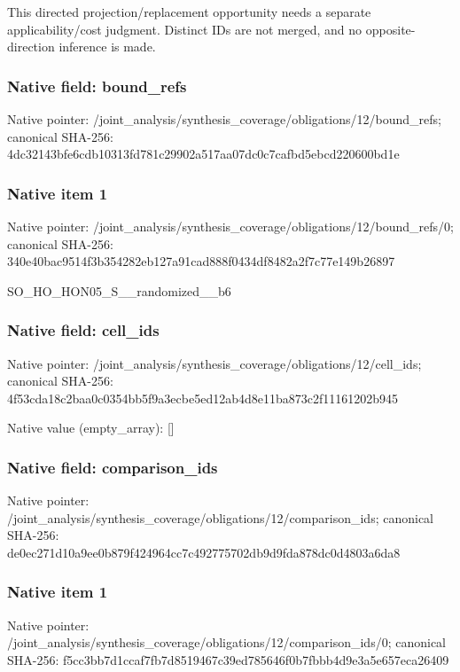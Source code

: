 \documentclass[10pt,a4paper]{article}
\begin{document}
\begingroup\raggedright\sloppy This directed projection/\allowbreak{}replacement opportunity needs a separate applicability/\allowbreak{}cost judgment. Distinct IDs are not merged,\allowbreak{} and no opposite-direction inference is made.\par\endgroup

\subsubsection{Native field: bound\_\allowbreak{}refs}
Native pointer: /joint\_\allowbreak{}analysis/synthesis\_\allowbreak{}coverage/obligations/12/bound\_\allowbreak{}refs; canonical SHA-256: 4dc32143bfe6cdb10313fd781c29902a517aa07dc0c7cafbd5ebcd220600bd1e

\subsubsection{Native item 1}
Native pointer: /joint\_\allowbreak{}analysis/synthesis\_\allowbreak{}coverage/obligations/12/bound\_\allowbreak{}refs/0; canonical SHA-256: 340e40bac9514f3b354282eb127a91cad888f0434df8482a2f7c77e149b26897

\begingroup\raggedright\sloppy SO\_\allowbreak{}HO\_\allowbreak{}HON05\_\allowbreak{}S\_\allowbreak{}\_\allowbreak{}randomized\_\allowbreak{}\_\allowbreak{}b6\par\endgroup

\subsubsection{Native field: cell\_\allowbreak{}ids}
Native pointer: /joint\_\allowbreak{}analysis/synthesis\_\allowbreak{}coverage/obligations/12/cell\_\allowbreak{}ids; canonical SHA-256: 4f53cda18c2baa0c0354bb5f9a3ecbe5ed12ab4d8e11ba873c2f11161202b945

Native value (empty\_\allowbreak{}array): []

\subsubsection{Native field: comparison\_\allowbreak{}ids}
Native pointer: /joint\_\allowbreak{}analysis/synthesis\_\allowbreak{}coverage/obligations/12/comparison\_\allowbreak{}ids; canonical SHA-256: de0ec271d10a9ee0b879f424964cc7c492775702db9d9fda878dc0d4803a6da8

\subsubsection{Native item 1}
Native pointer: /joint\_\allowbreak{}analysis/synthesis\_\allowbreak{}coverage/obligations/12/comparison\_\allowbreak{}ids/0; canonical SHA-256: f5cc3bb7d1ccaf7fb7d8519467c39ed785646f0b7fbbb4d9e3a5e657eca26409
\end{document}
